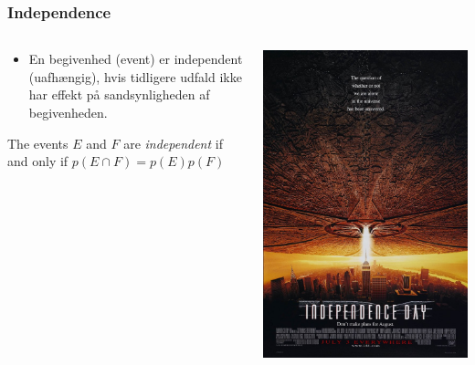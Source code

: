 \documentclass{beamer}
\begin{document}
\begin{frame}
  \frametitle{Independence}
  \begin{columns}
    \begin{column}{.5\textwidth}
      \begin{itemize}
      \item En begivenhed (event) er independent (uafhængig), hvis tidligere udfald ikke har effekt på sandsynligheden af begivenheden.
      \end{itemize}
      \begin{definition}[Definition 4]
        The events \(E\) and \(F\) are \textit{independent} if and only if \(p(E \cap F) = p(E)p(F)\)
      \end{definition}
    \end{column}
    \begin{column}{.5\textwidth}
      \includegraphics[width=\linewidth]{independence-day.png}
    \end{column}
  \end{columns} 
\end{frame}
\end{document}
